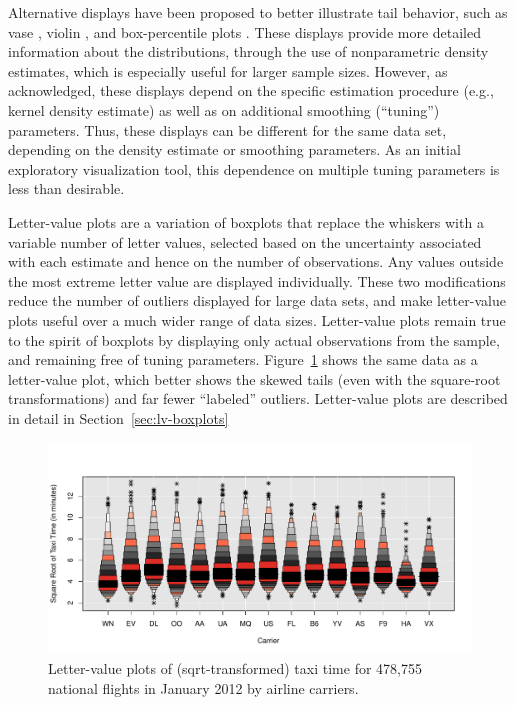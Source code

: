 \documentclass[12pt,oneside]{article}
\begin{document}

Alternative displays have been proposed to better illustrate tail behavior,
such as vase \citep{vase}, violin \citep{violin}, and box-percentile plots
\citep{box.percentiles}. These displays provide more detailed information
about the distributions, through the use of nonparametric density estimates,
which is especially useful for larger sample sizes. However, as \citet{vase}
acknowledged, these displays depend on the specific estimation procedure
(e.g., kernel density estimate) as well as on additional smoothing
(``tuning'') parameters. Thus, these displays can be different for the same
data set, depending on the density estimate or smoothing parameters. As an
initial exploratory visualization tool, this dependence on multiple tuning
parameters is less than desirable.

Letter-value plots are a variation of boxplots that replace the whiskers with
a variable number of letter values, selected based on the uncertainty
associated with each estimate and hence on the number of observations. Any
values outside the most extreme letter value are displayed individually. These
two modifications reduce the number of outliers displayed for large data
sets, and make letter-value plots useful over a much wider range of data
sizes. Letter-value plots remain true to the spirit of boxplots by displaying
only actual observations from the sample, and remaining free of tuning
parameters. Figure~\ref{fig:taxi-lv} shows the same data as a
letter-value plot, which better shows the skewed tails (even with the
square-root transformations) and far fewer ``labeled'' outliers. Letter-value
plots are described in detail in Section~\ref{sec:lv-boxplots}

\begin{figure}[hbtp]
  \centering
  \includegraphics[width=\linewidth]{taxi-lv}

  \caption{Letter-value plots of (sqrt-transformed) taxi time for 478,755 national flights in January 2012 by airline carriers.}

  \label{fig:taxi-lv} 
\end{figure}
\end{document}
